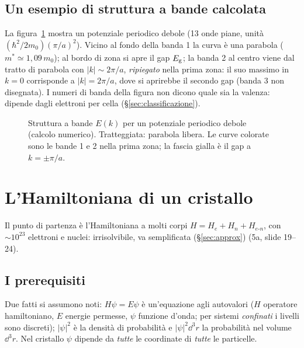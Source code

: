 \documentclass[11pt,a4paper]{article}
\begin{document}
\subsection{Un esempio di struttura a bande calcolata}
La figura~\ref{fig:ek} mostra un potenziale periodico debole (13 onde piane, unità $(\hbar^2/2m_0)(\pi/a)^2$). Vicino al fondo della banda 1 la curva
è una parabola ($m^*\simeq1{,}09\,m_0$); al bordo di zona si apre il gap $E_{\mathrm g}$; la banda 2 al centro viene dal tratto di parabola con $|k|\sim2\pi/a$,
\emph{ripiegato} nella prima zona: il suo massimo in $k=0$ corrisponde a $|k|=2\pi/a$, dove si aprirebbe il secondo gap (banda 3 non disegnata). I
numeri di banda della figura non dicono quale sia la valenza: dipende dagli elettroni per cella (§\ref{sec:classificazione}).

\begin{figure}[tbp]
\centering
{}
\caption{Struttura a bande $E(k)$ per un potenziale periodico debole (calcolo numerico). Tratteggiata: parabola libera. Le curve colorate sono
le bande 1 e 2 nella prima zona; la fascia gialla è il gap a $k=\pm\pi/a$.}\label{fig:ek}
\end{figure}

\section{L'Hamiltoniana di un cristallo}\label{sec:hamiltoniana}
Il punto di partenza è l'Hamiltoniana a molti corpi $H=H_e+H_n+H_{e\text{-}n}$, con $\sim10^{23}$ elettroni e nuclei: irrisolvibile, va semplificata
(§\ref{sec:approx}) (5a, slide 19--24).

\subsection{I prerequisiti}
Due fatti si assumono noti: $H\psi=E\psi$ è un'equazione agli autovalori ($H$ operatore hamiltoniano, $E$ energie permesse, $\psi$ funzione
d'onda; per sistemi \emph{confinati} i livelli sono discreti); $|\psi|^2$ è la densità di probabilità e $|\psi|^2\dd^3r$ la probabilità nel volume
$\dd^3r$. Nel cristallo $\psi$ dipende da \emph{tutte} le coordinate di \emph{tutte} le particelle.
\end{document}
